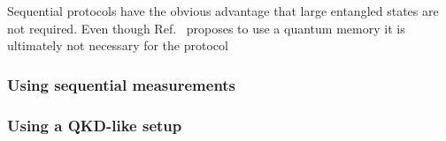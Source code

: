 Sequential protocols have the obvious advantage that large entangled states are not required. Even though Ref.~\cite{Zhang2005} proposes to use a quantum memory it is ultimately not necessary for the protocol 


%
%
\subsubsection*{Using sequential measurements}
\subsubsection*{Using a QKD-like setup}